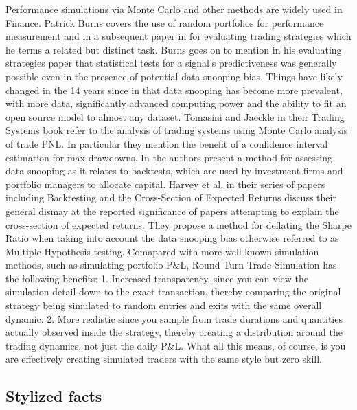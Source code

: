 Performance simulations via Monte Carlo and other methods are widely
used in Finance. Patrick Burns \citep{Burns2004} covers the use of
random portfolios for performance measurement and in a subsequent paper
in \citet{burns2006} for evaluating trading strategies which he terms a
related but distinct task. Burns goes on to mention in his evaluating
strategies paper that statistical tests for a signal's predictiveness
was generally possible even in the presence of potential data snooping
bias. Things have likely changed in the 14 years since in that data
snooping has become more prevalent, with more data, significantly
advanced computing power and the ability to fit an open source model to
almost any dataset. Tomasini and Jaeckle in their Trading Systems book
\citep{tomasini2009} refer to the analysis of trading systems using
Monte Carlo analysis of trade PNL. In particular they mention the
benefit of a confidence interval estimation for max drawdowns. In
\citet{Bailey2014probability} the authors present a method for assessing
data snooping as it relates to backtests, which are used by investment
firms and portfolio managers to allocate capital. Harvey et al, in their
series of papers including Backtesting \citep{Harvey2013backtesting} and
the Cross-Section of Expected Returns \citep{Harvey2015crosssection}
discuss their general dismay at the reported significance of papers
attempting to explain the cross-section of expected returns. They
propose a method for deflating the Sharpe Ratio when taking into account
the data snooping bias otherwise referred to as Multiple Hypothesis
testing. Comapared with more well-known simulation methods, such as
simulating portfolio P\&L, Round Turn Trade Simulation has the following
benefits: 1. Increased transparency, since you can view the simulation
detail down to the exact transaction, thereby comparing the original
strategy being simulated to random entries and exits with the same
overall dynamic. 2. More realistic since you sample from trade durations
and quantities actually observed inside the strategy, thereby creating a
distribution around the trading dynamics, not just the daily P\&L. What
all this means, of course, is you are effectively creating simulated
traders with the same style but zero skill.

\hypertarget{stylized-facts}{%
\subsection{Stylized facts}\label{stylized-facts}}

